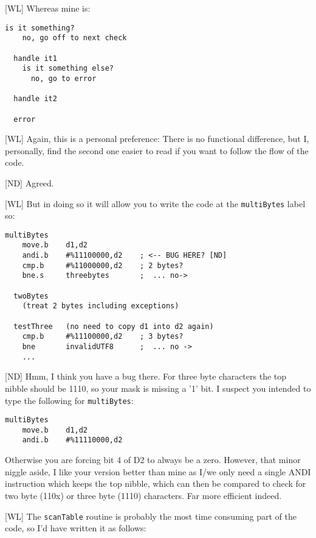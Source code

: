 [WL] Whereas mine is:
	
\begin{lstlisting}[numbers=none]	
  is it something?
    no, go off to next check

  handle it1
    is it something else?
      no, go to error

  handle it2

  error
\end{lstlisting}
	
[WL] Again, this is a personal preference: There is no functional difference, but I, personally, find the second one easier to read if you want to follow the flow of the code.

[ND] Agreed.
	
[WL] But in doing so it will allow you to write the code at the \texttt{multiBytes} label so:
	
\begin{lstlisting}[numbers=none]	
  multiBytes
    move.b    d1,d2
    andi.b    #%11100000,d2    ; <-- BUG HERE? [ND]
    cmp.b     #%11000000,d2    ; 2 bytes?
    bne.s     threebytes       ;  ... no->

  twoBytes
    (treat 2 bytes including exceptions)

  testThree   (no need to copy d1 into d2 again)
    cmp.b     #%11100000,d2    ; 3 bytes?
    bne       invalidUTF8      ;  ... no ->
    ...
\end{lstlisting}
	
[ND] Hmm, I think you have a bug there. For three byte characters the top nibble should be 1110, so your mask is missing a '1' bit. I suspect you intended to type the following for \texttt{multiBytes}:

\begin{lstlisting}[numbers=none]	
  multiBytes
    move.b    d1,d2
    andi.b    #%11110000,d2
\end{lstlisting}

Otherwise you are forcing bit 4 of D2 to always be a zero. However, that minor niggle aside, I like your version better than mine as I/we only need a single ANDI instruction which keeps the top nibble, which can then be compared to check for two byte (110x) or three byte (1110) characters. Far more efficient indeed.

	
[WL] The \texttt{scanTable} routine is probably the most time consuming part of the code, so I'd have written it as follows:

